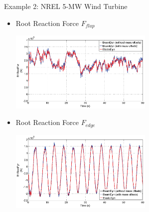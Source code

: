 \documentclass[xcolor=cmyk]{beamer}
\begin{document}
\begin{frame}{Example 2: NREL 5-MW Wind Turbine}
    \begin{itemize}
        \item
        Root Reaction Force $F_{flap}$
         \begin{center}
         \includegraphics[width=2.7in]{EPSF/B1RootFxr.eps}
         \end{center}
         \item
         Root Reaction Force $F_{edge}$
         \begin{center}
         \includegraphics[width=2.7in]{EPSF/B1RootFyr.eps}
         \end{center}
    \end{itemize}
\end{frame}
\end{document}
